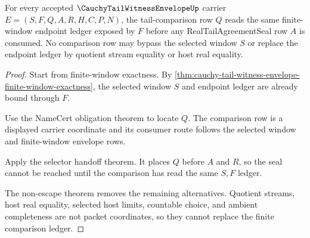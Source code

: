 \begin{theorem}
\label{thm:cauchy-tail-witness-envelope-tail-comparison-exactness}
For every accepted $\CauchyTailWitnessEnvelopeUp$ carrier $E=(S,F,Q,A,R,H,C,P,N)$, the tail-comparison row $Q$ reads the same finite-window endpoint ledger exposed by $F$ before any RealTailAgreementSeal row $A$ is consumed. No comparison row may bypass the selected window $S$ or replace the endpoint ledger by quotient stream equality or host real equality.
\end{theorem}
\begin{proof}
Start from finite-window exactness. By \autoref{thm:cauchy-tail-witness-envelope-finite-window-exactness}, the selected window $S$ and endpoint ledger are already bound through $F$.

Use the NameCert obligation theorem to locate $Q$. The comparison row is a displayed carrier coordinate and its consumer route follows the selected window and finite-window envelope rows.

Apply the selector handoff theorem. It places $Q$ before $A$ and $R$, so the seal cannot be reached until the comparison has read the same $S,F$ ledger.

The non-escape theorem removes the remaining alternatives. Quotient streams, host real equality, selected host limits, countable choice, and ambient completeness are not packet coordinates, so they cannot replace the finite comparison ledger.
\end{proof}

